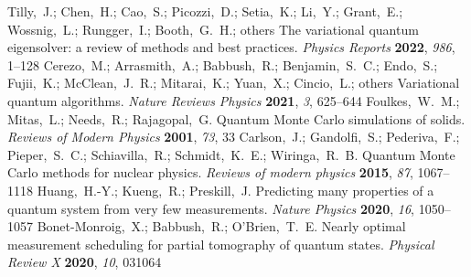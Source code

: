 \documentclass[journal=jctcce,a4paper,manuscript=article]{achemso}
\begin{document}
\begin{mcitethebibliography}{41}
  Tilly,~J.; Chen,~H.; Cao,~S.; Picozzi,~D.; Setia,~K.; Li,~Y.; Grant,~E.; Wossnig,~L.; Rungger,~I.; Booth,~G.~H.; others The variational quantum eigensolver: a review of methods and best practices. \emph{Physics Reports} \textbf{2022}, \emph{986}, 1--128\relax
  \mciteBstWouldAddEndPuncttrue
  \mciteSetBstMidEndSepPunct{\mcitedefaultmidpunct}
  {\mcitedefaultendpunct}{\mcitedefaultseppunct}\relax
  \EndOfBibitem
  Cerezo,~M.; Arrasmith,~A.; Babbush,~R.; Benjamin,~S.~C.; Endo,~S.; Fujii,~K.; McClean,~J.~R.; Mitarai,~K.; Yuan,~X.; Cincio,~L.; others Variational quantum algorithms. \emph{Nature Reviews Physics} \textbf{2021}, \emph{3}, 625--644\relax
  \mciteBstWouldAddEndPuncttrue
  \mciteSetBstMidEndSepPunct{\mcitedefaultmidpunct}
  {\mcitedefaultendpunct}{\mcitedefaultseppunct}\relax
  \EndOfBibitem
  Foulkes,~W.~M.; Mitas,~L.; Needs,~R.; Rajagopal,~G. Quantum Monte Carlo simulations of solids. \emph{Reviews of Modern Physics} \textbf{2001}, \emph{73}, 33\relax
  \mciteBstWouldAddEndPuncttrue
  \mciteSetBstMidEndSepPunct{\mcitedefaultmidpunct}
  {\mcitedefaultendpunct}{\mcitedefaultseppunct}\relax
  \EndOfBibitem
  Carlson,~J.; Gandolfi,~S.; Pederiva,~F.; Pieper,~S.~C.; Schiavilla,~R.; Schmidt,~K.~E.; Wiringa,~R.~B. Quantum Monte Carlo methods for nuclear physics. \emph{Reviews of modern physics} \textbf{2015}, \emph{87}, 1067--1118\relax
  \mciteBstWouldAddEndPuncttrue
  \mciteSetBstMidEndSepPunct{\mcitedefaultmidpunct}
  {\mcitedefaultendpunct}{\mcitedefaultseppunct}\relax
  \EndOfBibitem
  Huang,~H.-Y.; Kueng,~R.; Preskill,~J. Predicting many properties of a quantum system from very few measurements. \emph{Nature Physics} \textbf{2020}, \emph{16}, 1050--1057\relax
  \mciteBstWouldAddEndPuncttrue
  \mciteSetBstMidEndSepPunct{\mcitedefaultmidpunct}
  {\mcitedefaultendpunct}{\mcitedefaultseppunct}\relax
  \EndOfBibitem
  Bonet-Monroig,~X.; Babbush,~R.; O’Brien,~T.~E. Nearly optimal measurement scheduling for partial tomography of quantum states. \emph{Physical Review X} \textbf{2020}, \emph{10}, 031064\relax

\end{mcitethebibliography}
\end{document}
